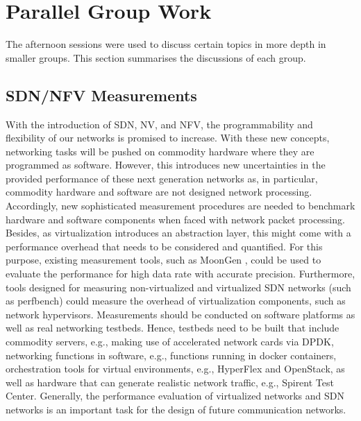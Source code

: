 \section{Parallel Group Work}\label{sec:parallel-group-work}

The afternoon sessions were used to discuss certain topics in more depth in
smaller groups. This section summarises the discussions of each group.

\subsection{SDN/NFV Measurements}

With the introduction of \ac{SDN}, \ac{NV}, and \ac{NFV}, the programmability
and flexibility of our networks is promised to increase. With these new
concepts, networking tasks will be pushed on commodity hardware where they are
programmed as software.  However, this introduces new uncertainties in the
provided performance of these next generation networks as, in particular,
commodity hardware and software are not designed network processing.
Accordingly, new sophisticated measurement procedures are needed to benchmark
hardware and software components when faced with network packet processing.
Besides, as virtualization introduces an abstraction layer, this might come
with a performance overhead that needs to be considered and quantified. For
this purpose, existing measurement tools, such as MoonGen
\cite{pemmerich:imc:2015}, could be used to evaluate the performance for high
data rate with accurate precision.  Furthermore, tools designed for measuring
non-virtualized and virtualized \ac{SDN} networks (such as perfbench) could
measure the overhead of virtualization components, such as network
hypervisors. Measurements should be conducted on software platforms as well as
real networking testbeds. Hence, testbeds need to be built that include
commodity servers, e.g., making use of accelerated network cards via
\ac{DPDK}, networking functions in software, e.g., functions running in docker
containers, orchestration tools for virtual environments, e.g., HyperFlex
\cite{ablenk:im:2015} and OpenStack, as well as hardware that can generate
realistic network traffic, e.g., Spirent Test Center.  Generally, the
performance evaluation of virtualized networks and SDN networks is an
important task for the design of future communication networks.

